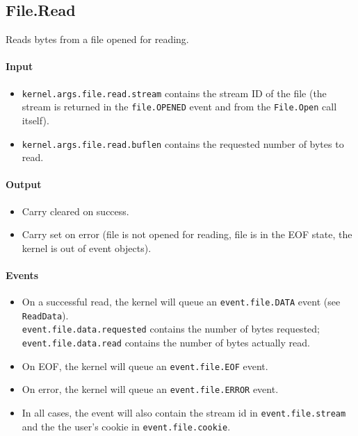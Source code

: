 \subsection*{File.Read}
Reads bytes from a file opened for reading.

\paragraph{Input}
\begin{itemize}
\item \verb+kernel.args.file.read.stream+ contains the stream ID of the file (the stream is returned in the {\tt file.\-OPENED} event and from the \verb+File.Open+ call itself).
\item \verb+kernel.args.file.read.buflen+ contains the requested number of bytes to read.
\end{itemize}

\paragraph{Output}
\begin{itemize}
\item Carry cleared on success.
\item Carry set on error (file is not opened for reading, file is in the EOF state, the kernel is out of event objects).
\end{itemize}

\paragraph{Events}
\begin{itemize}
\item On a successful read, the kernel will queue an \verb+event.file.DATA+ event (see \verb+ReadData+). \\ \verb+event.file.data.requested+ contains the number of bytes requested;  \verb+event.file.data.read+ contains the number of bytes actually read.
\item On EOF, the kernel will queue an \verb+event.file.EOF+ event.
\item On error, the kernel will queue an \verb+event.file.ERROR+ event.
\item In all cases, the event will also contain the stream id in \verb+event.file.stream+ and the the user's cookie in \verb+event.file.cookie+.
\end{itemize}

